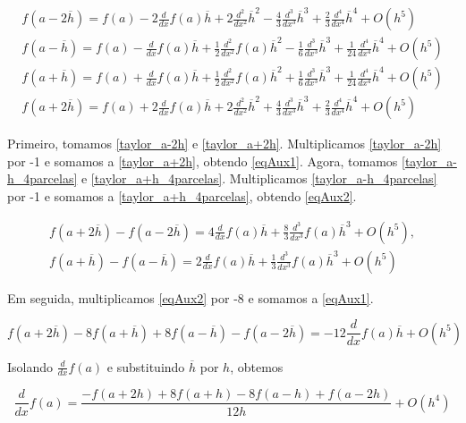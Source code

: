 \documentclass[]{article}
\numberwithin{equation}{section}
\begin{document}
\begin{align}
f(a - 2\overline{h}) = f(a) - 2\frac{d}{dx} f(a) \overline{h} + 2\frac{d^2}{dx^2} \overline{h}^2 - \frac{4}{3} \frac{d^3}{dx^3} \overline{h}^3 + \frac{2}{3} \frac{d^4}{dx^4} \overline{h}^4 + O(h^5) \label{taylor_a-2h} \\
f(a - \overline{h}) = f(a) - \frac{d}{dx} f(a)\overline{h} + \frac{1}{2} \frac{d^2}{dx^2} f(a) \overline{h}^2 - \frac{1}{6} \frac{d^3}{dx^3} \overline{h}^3 + \frac{1}{24} \frac{d^4}{dx^4} \overline{h}^4 + O(h^5) \label{taylor_a-h_4parcelas} \\
f(a + \overline{h}) = f(a) + \frac{d}{dx} f(a)\overline{h} + \frac{1}{2} \frac{d^2}{dx^2} f(a) \overline{h}^2 + \frac{1}{6} \frac{d^3}{dx^3} \overline{h}^3 + \frac{1}{24} \frac{d^4}{dx^4} \overline{h}^4 + O(h^5) \label{taylor_a+h_4parcelas} \\
f(a + 2\overline{h}) = f(a) + 2\frac{d}{dx} f(a) \overline{h} + 2\frac{d^2}{dx^2} \overline{h}^2 + \frac{4}{3} \frac{d^3}{dx^3} \overline{h}^3 + \frac{2}{3} \frac{d^4}{dx^4} \overline{h}^4 + O(h^5) \label{taylor_a+2h}
\end{align}

Primeiro, tomamos \eqref{taylor_a-2h} e \eqref{taylor_a+2h}. Multiplicamos \eqref{taylor_a-2h} por -1 e somamos a \eqref{taylor_a+2h}, obtendo \eqref{eqAux1}. Agora, tomamos \eqref{taylor_a-h_4parcelas} e \eqref{taylor_a+h_4parcelas}. Multiplicamos \eqref{taylor_a-h_4parcelas} por -1 e somamos a \eqref{taylor_a+h_4parcelas}, obtendo \eqref{eqAux2}.

\begin{align}
f(a + 2\overline{h}) - f(a - 2\overline{h}) = 4\frac{d}{dx} f(a) \overline{h} + \frac{8}{3} \frac{d^3}{dx^3} f(a) \overline{h}^3 + O(h^5), \label{eqAux1} \\
f(a + \overline{h}) - f(a - \overline{h}) = 2\frac{d}{dx} f(a) \overline{h} + \frac{1}{3} \frac{d^3}{dx^3} f(a) \overline{h}^3 + O(h^5) \label{eqAux2}
\end{align}

Em seguida, multiplicamos \eqref{eqAux2} por -8 e somamos a \eqref{eqAux1}.

$$
f(a + 2\overline{h}) - 8f(a + \overline{h}) + 8f(a - \overline{h}) - f(a - 2\overline{h}) = -12\frac{d}{dx} f(a) \overline{h} + O(h^5)
$$

Isolando $\frac{d}{dx} f(a)$ e substituindo $\overline{h}$ por $h$, obtemos

$$
\frac{d}{dx} f(a) = \frac{-f(a + 2h) + 8f(a + h) - 8f(a - h) + f(a - 2h)}{12h} + O(h^4)
$$
\end{document}
